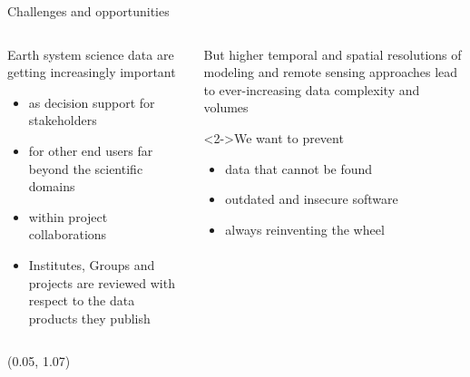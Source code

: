 \begin{frame}{Challenges and opportunities}
    \begin{columns}[T]
        \begin{column}{0.45\linewidth}
            Earth system science data are getting increasingly important
            \begin{itemize}
                \item as decision support for stakeholders
                \item for other end users far beyond the scientific domains
                \item within project collaborations
                \item Institutes, Groups and projects are reviewed with respect
                    to the data products they publish
            \end{itemize}
        \end{column}
        \begin{column}{0.45\linewidth}
            But higher temporal and spatial resolutions of modeling and
            remote sensing approaches lead to ever-increasing data
            complexity and volumes

            \vspace{1em}

            \begin{alertblock}<2->{We want to prevent}
                \begin{itemize}
                    \item data that cannot be found
                    \item outdated and insecure software
                    \item always reinventing the wheel
                \end{itemize}
            \end{alertblock}

        \end{column}
    \end{columns}

    \begin{textblock*}{\textwidth}(0.05\linewidth, 1.07\textheight)
		\slidebuttons
	\end{textblock*}

\end{frame}

